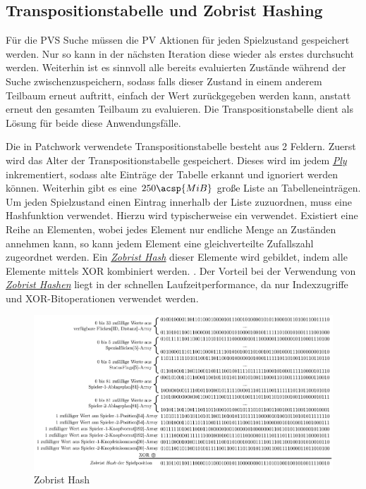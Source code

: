\subsection{Transpositionstabelle und Zobrist Hashing}

Für die \ac{PVS} Suche müssen die \ac{PV} Aktionen für jeden Spielzustand gespeichert werden. Nur so kann in der nächsten Iteration diese wieder als erstes durchsucht werden. Weiterhin ist es sinnvoll alle bereits evaluierten Zustände während der Suche zwischenzuspeichern, sodass falls dieser Zustand in einem anderem Teilbaum erneut auftritt, einfach der Wert zurückgegeben werden kann, anstatt erneut den gesamten Teilbaum zu evaluieren. Die Transpositionstabelle dient als Lösung für beide diese Anwendungsfälle.

Die in Patchwork verwendete Transpositionstabelle besteht aus 2 Feldern. Zuerst wird das Alter der Transpositionstabelle gespeichert. Dieses wird im jedem \hyperref[text:ply]{\emph{Ply}} inkrementiert, sodass alte Einträge der Tabelle erkannt und ignoriert werden können. Weiterhin gibt es eine $250\acsp{MiB}$ große Liste an Tabelleneinträgen. Um jeden Spielzustand einen Eintrag innerhalb der Liste zuzuordnen, muss eine Hashfunktion verwendet. Hierzu wird typischerweise ein  verwendet. Existiert eine Reihe an Elementen, wobei jedes Element nur endliche Menge an Zuständen annehmen kann, so kann jedem Element eine gleichverteilte Zufallszahl zugeordnet werden. Ein \hyperref[text:zobrist-hash]{\emph{Zobrist Hash}} dieser Elemente wird gebildet, indem alle Elemente mittels \ac{XOR} kombiniert werden. \cite[S. 3]{1990.ZobristHash}. Der Vorteil bei der Verwendung von \hyperref[text:zobrist-hash]{\emph{Zobrist Hashen}}  liegt in der schnellen Laufzeitperformance, da nur Indexzugriffe und \ac{XOR}-Bitoperationen verwendet werden.

\vspace*{-0.09cm}

\begin{figure}[!ht]
    \centering
    \includegraphics[width=\textwidth]{res/pictures/zobrist-hash.pdf}
    \vspace*{-0.35cm}
    \caption{Zobrist Hash}
    \label{fig:zobrist-hash}
\end{figure}

